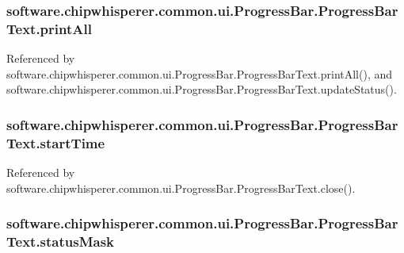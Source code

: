 \subsubsection[{print\+All}]{\setlength{\rightskip}{0pt plus 5cm}software.\+chipwhisperer.\+common.\+ui.\+Progress\+Bar.\+Progress\+Bar\+Text.\+print\+All}\label{classsoftware_1_1chipwhisperer_1_1common_1_1ui_1_1ProgressBar_1_1ProgressBarText_a61554f0e647192d2b7986d3f75ce401c}


Referenced by software.\+chipwhisperer.\+common.\+ui.\+Progress\+Bar.\+Progress\+Bar\+Text.\+print\+All(), and software.\+chipwhisperer.\+common.\+ui.\+Progress\+Bar.\+Progress\+Bar\+Text.\+update\+Status().

\hypertarget{classsoftware_1_1chipwhisperer_1_1common_1_1ui_1_1ProgressBar_1_1ProgressBarText_a47b5b3cf29b07e0d098fe2992b7f9576}{}
\subsubsection[{start\+Time}]{\setlength{\rightskip}{0pt plus 5cm}software.\+chipwhisperer.\+common.\+ui.\+Progress\+Bar.\+Progress\+Bar\+Text.\+start\+Time}\label{classsoftware_1_1chipwhisperer_1_1common_1_1ui_1_1ProgressBar_1_1ProgressBarText_a47b5b3cf29b07e0d098fe2992b7f9576}


Referenced by software.\+chipwhisperer.\+common.\+ui.\+Progress\+Bar.\+Progress\+Bar\+Text.\+close().

\hypertarget{classsoftware_1_1chipwhisperer_1_1common_1_1ui_1_1ProgressBar_1_1ProgressBarText_a633fd5231d5202f71477d0058589b9c0}{}
\subsubsection[{status\+Mask}]{\setlength{\rightskip}{0pt plus 5cm}software.\+chipwhisperer.\+common.\+ui.\+Progress\+Bar.\+Progress\+Bar\+Text.\+status\+Mask}\label{classsoftware_1_1chipwhisperer_1_1common_1_1ui_1_1ProgressBar_1_1ProgressBarText_a633fd5231d5202f71477d0058589b9c0}


